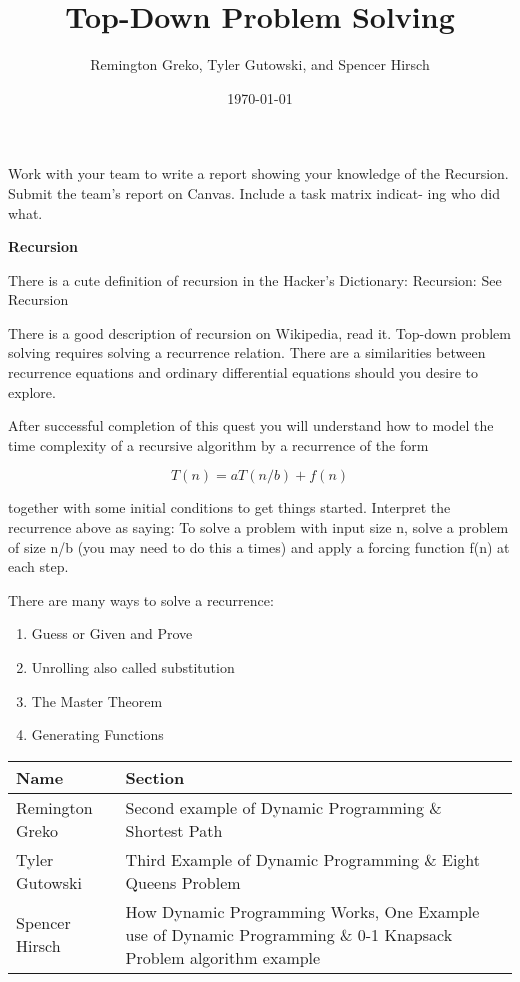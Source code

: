 \documentclass{article}
\begin{document}
\title{\textbf{Top-Down Problem Solving}}
\author{Remington Greko, Tyler Gutowski, and Spencer Hirsch}
\date{\today}

\maketitle

Work with your team to write a report showing your knowledge of
the Recursion.
Submit the team’s report on Canvas. Include a task matrix indicat-
ing who did what.

\textbf{Recursion}

There is a cute definition of recursion in the Hacker’s Dictionary: Recursion: See Recursion

\smallskip

There is a good description of recursion on Wikipedia, read it.
Top-down problem solving requires solving a recurrence relation.
There are a similarities between recurrence equations and ordinary
differential equations should you desire to explore.

\smallskip

After successful completion of this quest you will understand
how to model the time complexity of a recursive algorithm by a
recurrence of the form

\[T(n) = aT(n/b) + f(n)\]

together with some initial conditions to get things started.
Interpret the recurrence above as saying:
To solve a problem with input size n, solve a problem of size n/b
(you may need to do this a times) and apply a forcing function f(n)
at each step.

There are many ways to solve a recurrence:

\begin{enumerate}
    \item Guess or Given and Prove
    \item Unrolling also called substitution
    \item The Master Theorem
    \item Generating Functions
\end{enumerate}

\bigskip

\pagebreak

\begin{center}
        \begin{tabular}{|p{3cm}|p{6cm}|}
            \hline
            \textbf{Name} & \textbf{Section} \\
            \hline
            Remington Greko & Second example of Dynamic Programming $\&$ Shortest Path\\
            \hline
            Tyler Gutowski & Third Example of Dynamic Programming $\&$ Eight Queens Problem\\
            \hline
            Spencer Hirsch & How Dynamic Programming Works, One Example use of Dynamic Programming $\&$ 0-1 Knapsack Problem algorithm example \\
            \hline
        \end{tabular}
    \end{center}
\end{document}
